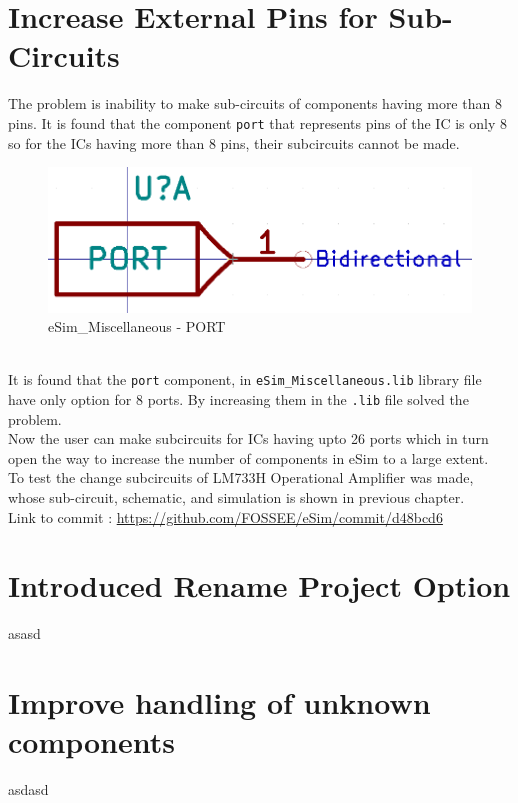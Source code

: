 \documentclass[12pt,a4paper]{report}
\begin{document}
\section{Increase External Pins for Sub-Circuits}
The problem is inability to make sub-circuits of components having more than 8 pins. It is found that the component \texttt{port} that represents pins of the IC is only 8 so for the ICs having more than 8 pins, their subcircuits cannot be made.
\begin{figure}[h]
	\centering
	\includegraphics[scale=0.3]{port}
	\caption{eSim\_Miscellaneous - PORT}
\end{figure} 
\\
It is found that the \texttt{port} component, in \texttt{eSim\_Miscellaneous.lib} library file have only option for 8 ports. By increasing them in the \texttt{.lib} file solved the problem.
\\
Now the user can make subcircuits for ICs having upto 26 ports which in turn open the way to increase the number of components in eSim to a large extent.
\\
To test the change subcircuits of LM733H Operational Amplifier was made, whose
sub-circuit, schematic, and simulation is shown in previous chapter.
\vspace{3mm}
\\
Link to commit : \url{https://github.com/FOSSEE/eSim/commit/d48bcd6}
\\
\section{Introduced Rename Project Option}
asasd
\section{Improve handling of unknown components}
asdasd
\end{document}

